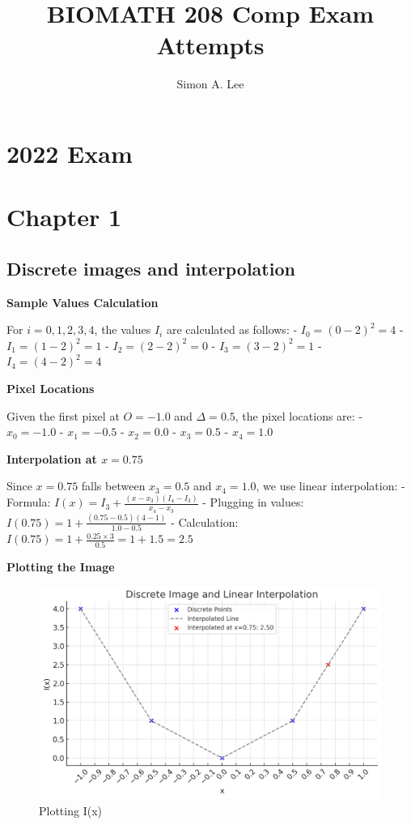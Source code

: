 \documentclass{article}
\title{BIOMATH 208 Comp Exam Attempts}
\author{Simon A. Lee}
\date{}
\begin{document}
\maketitle

\section*{2022 Exam}
\section{Chapter 1}
\subsection{Discrete images and interpolation}

\textbf{Sample Values Calculation}

For \( i = 0, 1, 2, 3, 4 \), the values \( I_i \) are calculated as follows:
- \( I_0 = (0 - 2)^2 = 4 \)
- \( I_1 = (1 - 2)^2 = 1 \)
- \( I_2 = (2 - 2)^2 = 0 \)
- \( I_3 = (3 - 2)^2 = 1 \)
- \( I_4 = (4 - 2)^2 = 4 \)

\textbf{Pixel Locations}

Given the first pixel at \( O = -1.0 \) and \( \Delta = 0.5 \), the pixel locations are:
- \( x_0 = -1.0 \)
- \( x_1 = -0.5 \)
- \( x_2 = 0.0 \)
- \( x_3 = 0.5 \)
- \( x_4 = 1.0 \)

\textbf{Interpolation at \( x = 0.75 \)}

Since \( x = 0.75 \) falls between \( x_3 = 0.5 \) and \( x_4 = 1.0 \), we use linear interpolation:
- Formula: \( I(x) = I_3 + \frac{(x - x_3)(I_4 - I_3)}{x_4 - x_3} \)
- Plugging in values: \( I(0.75) = 1 + \frac{(0.75 - 0.5)(4 - 1)}{1.0 - 0.5} \)
- Calculation: \( I(0.75) = 1 + \frac{0.25 \times 3}{0.5} = 1 + 1.5 = 2.5 \)

\textbf{Plotting the Image}

\begin{figure}[h!]
    \centering
    \includegraphics[width=0.5\linewidth]{1.1.png}
    \caption{Plotting I(x)}
    \label{fig:enter-label}
\end{figure}
\end{document}
